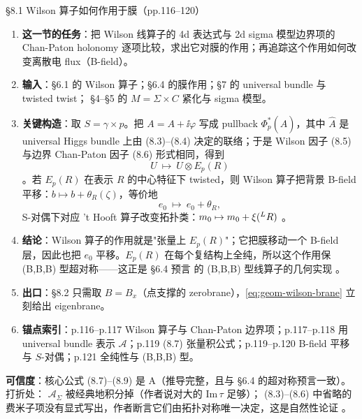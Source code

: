 \begin{kcard}{\S8.1 Wilson 算子如何作用于膜（pp.116--120）}
\begin{enumerate}[label=\textbf{\arabic*}]
\item \textbf{这一节的任务}：把 Wilson 线算子的 4d 表达式与 2d sigma 模型边界项的 Chan-Paton
  holonomy 逐项比较，求出它对膜的作用；再追踪这个作用如何改变离散电 flux（B-field）。
\item \textbf{输入}：\S6.1 的 Wilson 算子；\S6.4 的膜作用；\S7 的 universal bundle 与 twisted twist；
  \S4--\S5 的 $M=\Sigma\times C$ 紧化与 sigma 模型。
\item \textbf{关键构造}：取 $S=\gamma\times p$。把 $A=A+\ii\varphi$ 写成 pullback
  $\Phi_p^*(\hat A)$，其中 $\hat A$ 是 universal Higgs bundle 上由 (8.3)--(8.4) 决定的联络；于是
  Wilson 因子 (8.5) 与边界 Chan-Paton 因子 (8.6) 形式相同，得到
\begin{equation}
U\ \longmapsto\ U\otimes E_p(R)
\label{eq:geom-wilson-brane}
\end{equation}
  \pA{}。若 $E_p(R)$ 在表示 $R$ 的中心特征下 twisted，则 Wilson
  算子把背景 B-field 平移：$b\mapsto b+\theta_R(\zeta)$，等价地
\begin{equation}
e_0\ \longmapsto\ e_0+\theta_R ,
\label{eq:geom-e0-shift}
\end{equation}
  S-对偶下对应 't Hooft 算子改变拓扑类：$m_0\mapsto m_0+\xi({}^{L}R)$ \pA{}。
\item \textbf{结论}：Wilson 算子的作用就是"张量上 $E_p(R)$"；它把膜移动一个 B-field 层，因此也把
  $e_0$ 平移。$E_p(R)$ 在每个复结构上全纯，所以这个作用保 (B,B,B) 型超对称——这正是 \S6.4 预言
  的 (B,B,B) 型线算子的几何实现 \pA{}。
\item \textbf{出口}：\S8.2 只需取 $B=B_x$（点支撑的 zerobrane），\eqref{eq:geom-wilson-brane} 立刻给出
  eigenbrane。
\item \textbf{锚点索引}：p.116--p.117 Wilson 算子与 Chan-Paton 边界项；p.117--p.118 用 universal
  bundle 表示 $\mathcal A$；p.119 (8.7) 张量积公式；p.119--p.120 B-field 平移与 $S$-对偶；p.121
  全纯性与 (B,B,B) 型。
\end{enumerate}
\textbf{可信度}：核心公式 (8.7)--(8.9) 是 A（推导完整，且与 \S6.4 的超对称预言一致）。打折处：
$\mathcal A_\Sigma$ 被经典地积分掉（作者说对大的 $\mathrm{Im}\,\tau$ 足够）\pB{}；
(8.3)--(8.6) 中省略的费米子项没有显式写出，作者断言它们由拓扑对称唯一决定，这是自然性论证
\pB{}。
\end{kcard}

